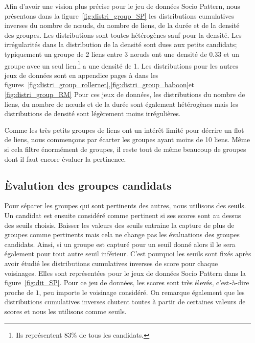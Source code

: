 Afin d'avoir une vision plus précise pour le jeu de données Socio Pattern, nous présentons dans la figure~\ref{fig:distri_group_SP} les distributions cumulatives inverses du nombre de n\oe uds, du nombre de liens, de la durée et de la densité des groupes.
Les distributions sont toutes hétérogènes sauf pour la densité.
Les irrégularités dans la distribution de la densité sont dues aux petits candidats; typiquement un groupe de 2 liens entre 3 n\oe uds ont une densité de $0.33$ et un groupe avec un seul lien\,\footnote{Ils représentent $83\%$ de tous les candidats.} a une densité de 1.
Les distributions pour les autres jeux de données sont en appendice pages \pageref{fig:distri_group_rollernet} à \pageref{fig:distri_group_RM} dans les figures~\ref{fig:distri_group_rollernet},\ref{fig:distri_group_baboon}et \ref{fig:distri_group_RM}
Pour ces jeux de données, les distributions du nombre de liens, du nombre de n\oe uds et de la durée sont également hétérogènes mais les distributions de densité sont légèrement moins irrégulières.


Comme les très petits groupes de liens ont un intérêt limité pour décrire un flot de liens, nous commençons par écarter les groupes ayant moins de 10 liens.
Même si cela filtre énormément de groupes, il reste tout de même beaucoup de groupes dont il faut encore évaluer la pertinence.




\subsection{\`Evalution des groupes candidats}

Pour séparer les groupes qui sont pertinents des autres, nous utilisons des seuils.
Un candidat est ensuite considéré comme pertinent si ses scores sont au dessus des seuils choisis.
Baisser les valeurs des seuils entraine la capture de plus de groupes comme pertinents mais cela ne change pas les évaluations des groupes candidats.
Ainsi, si un groupe est capturé pour un seuil donné alors il le sera également pour tout autre seuil inférieur.
C'est pourquoi les seuils sont fixés après avoir étudié les distributions cumulatives inverses de score pour chaque voisinages.
Elles sont représentées pour le jeux de données Socio Pattern dans la figure~\ref{fig:dit_SP}.
Pour ce jeu de données, les scores sont très élevés, c'est-à-dire proche de $1$, peu importe le voisinage considéré.
On remarque également que les distributions cumulatives inverses chutent toutes à partir de certaines valeurs de scores et nous les utilisons comme seuils.

